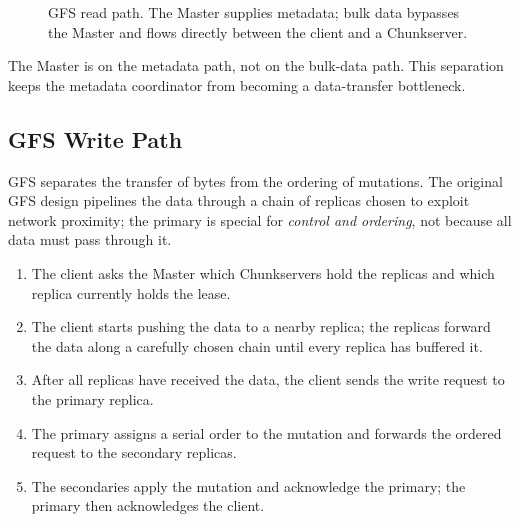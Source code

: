 \documentclass[11pt,a4paper,oneside]{book}
\begin{document}
\begin{figure}[htbp]
\centering
{}
\caption{GFS read path. The Master supplies metadata; bulk data bypasses the Master and flows directly between the client and a Chunkserver.}
\label{fig:gfs-read}
\end{figure}

\begin{keyconcept}
The Master is on the metadata path, not on the bulk-data path. This separation keeps the metadata coordinator from becoming a data-transfer bottleneck.
\end{keyconcept}

\subsection{GFS Write Path}

GFS separates the transfer of bytes from the ordering of mutations. The original GFS design pipelines the data through a chain of replicas chosen to exploit network proximity; the primary is special for \emph{control and ordering}, not because all data must pass through it.

\begin{enumerate}
    \item The client asks the Master which Chunkservers hold the replicas and which replica currently holds the lease.
    \item The client starts pushing the data to a nearby replica; the replicas forward the data along a carefully chosen chain until every replica has buffered it.
    \item After all replicas have received the data, the client sends the write request to the primary replica.
    \item The primary assigns a serial order to the mutation and forwards the ordered request to the secondary replicas.
    \item The secondaries apply the mutation and acknowledge the primary; the primary then acknowledges the client.
\end{enumerate}
\end{document}
